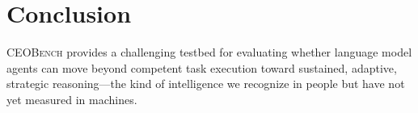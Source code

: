 \documentclass[10pt,letterpaper,twocolumn]{article}
\begin{document}
\section{Conclusion}

\textsc{CEOBench} provides a challenging testbed for evaluating whether language model agents can move beyond competent task execution toward sustained, adaptive, strategic reasoning---the kind of intelligence we recognize in people but have not yet measured in machines.

{\small


}
\end{document}
